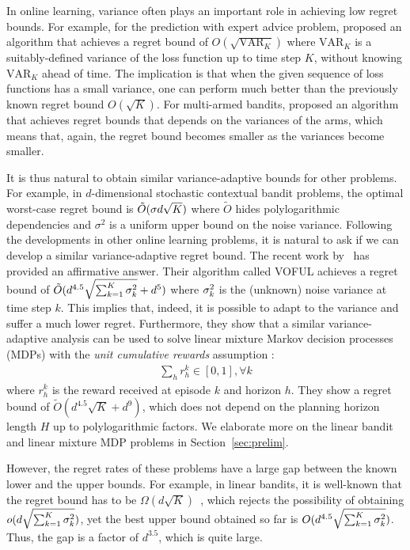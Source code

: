 \documentclass{article}
\begin{document}
In online learning, variance often plays an important role in achieving low regret bounds.
For example, for the prediction with expert advice problem, \citet{hazan10extracting} proposed an algorithm that achieves a regret bound of $O(\sqrt{\text{VAR}_K})$ where $\text{VAR}_K$ is a suitably-defined variance of the loss function up to time step $K$, without knowing $\text{VAR}_K$ ahead of time.
The implication is that when the given sequence of loss functions has a small variance, one can perform much better than the previously known regret bound $O(\sqrt{K})$. 
For multi-armed bandits, \citet{audibert2006use} proposed an algorithm that achieves regret bounds that depends on the variances of the arms, which means that, again, the regret bound becomes smaller as the variances become smaller.

It is thus natural to obtain similar variance-adaptive bounds for other problems.
For example, in $d$-dimensional stochastic contextual bandit problems, the optimal worst-case regret bound is $\tilde O(\sigma d\sqrt{K})$ where $\tilde O$ hides polylogarithmic dependencies and $\sigma^2$ is a uniform upper bound on the noise variance.
Following the developments in other online learning problems, it is natural to ask if we can develop a similar variance-adaptive regret bound.
The recent work by~\citet{zhang21variance} has provided an affirmative answer.
Their algorithm called VOFUL achieves a regret bound of $\tilde O(d^{4.5}\sqrt{\sum_{k=1}^K \sigma_k^2} + d^5)$ where $\sigma_k^2$ is the (unknown) noise variance at time step $k$.
This implies that, indeed, it is possible to adapt to the variance and suffer a much lower regret.
Furthermore, they show that a similar variance-adaptive analysis can be used to solve linear mixture Markov decision processes (MDPs) with the \textit{unit cumulative rewards} assumption :
\begin{align}\label{eq:ucr}
  \sum_{h} r^k_h \in [0,1], \forall k  
\end{align}
where $r^k_h$ is the reward received at episode $k$ and horizon $h$.
They show a regret bound of $\tilde O(d^{4.5}\sqrt{K}+d^9)$, which does not depend on the planning horizon length $H$ up to polylogarithmic factors.
We elaborate more on the linear bandit and linear mixture MDP problems in Section~\ref{sec:prelim}.

However, the regret rates of these problems have a large gap between the known lower and the upper bounds.
For example, in linear bandits, it is well-known that the regret bound has to be $\Omega(d\sqrt{K})$~\cite{dani08stochastic}, which rejects the possibility of obtaining $o(d\sqrt{\sum_{k=1}^K \sigma^2_k})$, yet the best upper bound obtained so far is $O(d^{4.5}\sqrt{\sum_{k=1}^K \sigma^2_k})$.
Thus, the gap is a factor of $d^{3.5}$, which is quite large.
\end{document}
